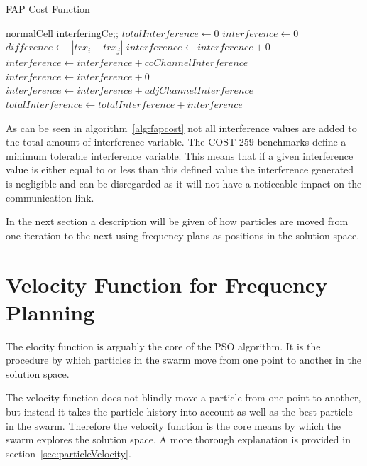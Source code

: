 \begin{algorithm}
\caption{FAP Cost Function}
\label{alg:fapcost}
	\begin{algorithmic}[1]
	\Require normalCell
	\Require interferingCe;;
	\State $totalInterference \leftarrow $0
			\State $interference \leftarrow 0$
			\State $difference \leftarrow$ $|trx_i - trx_j|$
					\State $interference \leftarrow interference + 0$
				\Else
					\State $interference \leftarrow interference + coChannelInterference$
				\EndIf
			\Else
						\State $interference \leftarrow interference + 0$
					\Else
						\State $interference \leftarrow interference + adjChannelInterference$
					\EndIf
				\EndIf
			\EndIf
			\State $totalInterference \leftarrow totalInterference + interference$
		\EndFor
	\EndFor
	\end{algorithmic}
\end{algorithm}

As can be seen in algorithm~\ref{alg:fapcost} not all interference values are added to the total amount of interference variable. The COST 259 benchmarks define a minimum tolerable interference variable. This means that if a given interference value is either equal to or less than this defined value the interference generated is negligible and can be disregarded as it will not have a noticeable impact on the communication link.

In the next section a description will be given of how particles are moved from one iteration to the next using frequency plans as positions in the solution space.
\section{Velocity Function for Frequency Planning}
\label{sec:velocityFAP}
The elocity function is arguably the core of the PSO algorithm. It is the procedure by which particles in the swarm move from one point to another in the solution space. 

The velocity function does not blindly move a particle from one point to another, but instead it takes the particle history into account as well as the best particle in the swarm. Therefore the velocity function is the core means by which the swarm explores the solution space. A more thorough explanation is provided in section~\ref{sec:particleVelocity}.

